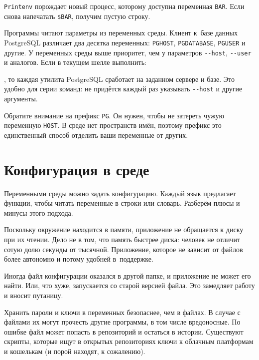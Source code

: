 \verb|Printenv| порождает новый процесс, которому доступна переменная
\verb|BAR|. Если снова напечатать \verb|$BAR|, получим пустую строку.


Программы читают параметры из переменных среды. Клиент к~базе данных PostgreSQL
различает два десятка переменных: \verb|PGHOST|, \verb|PGDATABASE|,
\verb|PGUSER| и другие. У переменных среды выше приоритет, чем у параметров
\verb|--host|, \verb|--user| и аналогов. Если в текущем шелле выполнить:

\begin{english}
\end{english}

\noindent
, то каждая утилита PostgreSQL сработает на заданном сервере и базе. Это удобно
для серии команд: не придётся каждый раз указывать \verb|--host| и другие
аргументы.

Обратите внимание на префикс \verb|PG|. Он нужен, чтобы не затереть чужую
переменную \verb|HOST|. В среде нет пространств имён, поэтому префикс это
единственный способ отделить ваши переменные от других.

\section{Конфигурация в среде}

Переменными среды можно задать конфигурацию. Каждый язык предлагает функции,
чтобы читать переменные в строки или словарь. Разберём плюсы и минусы этого
подхода.

Поскольку окружение находится в памяти, приложение не обращается к диску при их
чтении. Дело не в том, что память быстрее диска: человек не отличит сотую долю
секунды от тысячной. Приложение, которое не зависит от файлов более автономно и
потому удобней в~поддержке.

Иногда файл конфигурации оказался в другой папке, и приложение не может его
найти. Или, что хуже, запускается со старой версией файла. Это замедляет работу
и вносит путаницу.

\label{password-note}


Хранить пароли и ключи в переменных безопаснее, чем в файлах. В случае с файлами
их могут прочесть другие программы, в том числе вредоносные. По ошибке файл
может попасть в репозиторий и остаться в истории. Существуют скрипты, которые
ищут в открытых репозиториях ключи к облачным платформам и кошелькам (и порой
находят, к сожалению).

